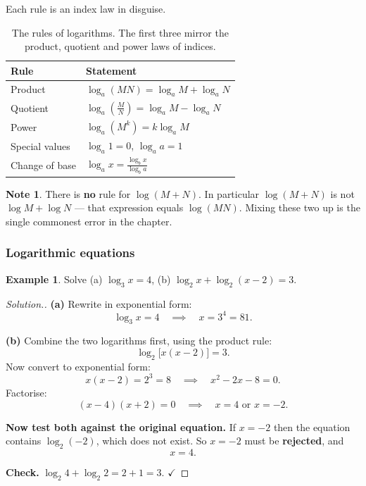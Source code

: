\documentclass[11pt,a4paper]{article}
\theoremstyle{definition}
\newtheorem{example}[thm]{Example}
\newtheorem{note}[thm]{Note}
\newenvironment{solution}
  {\renewcommand{\qedsymbol}{}\begin{proof}[\textit{Solution}.]}
  {\end{proof}}
\let\amscheckmark\checkmark
\renewcommand{\checkmark}{\ensuremath{\amscheckmark}}
\begin{document}
Each rule is an index law in disguise.

\begin{table}[H]
\centering
\begin{tabular}{|l|l|}
\hline
Rule & Statement\\
\hline
Product & $\log_a(MN)=\log_a M+\log_a N$\\
Quotient & $\log_a\!\left(\frac{M}{N}\right)=\log_a M-\log_a N$\\
Power & $\log_a\left(M^k\right)=k\log_a M$\\
Special values & $\log_a 1=0$, \quad $\log_a a=1$\\
Change of base & $\log_a x=\frac{\log_b x}{\log_b a}$\\
\hline
\end{tabular}
\caption{The rules of logarithms. The first three mirror the product, quotient and power laws of indices.}
\end{table}

\begin{note}
There is \textbf{no} rule for $\log(M+N)$. In particular $\log(M+N)$ is not
$\log M+\log N$ --- that expression equals $\log(MN)$. Mixing these two up is the single
commonest error in the chapter.
\end{note}

\subsubsection{Logarithmic equations}

\begin{example}
Solve (a) $\log_3 x=4$, \quad (b) $\log_2 x+\log_2(x-2)=3$.
\end{example}

\begin{solution}
\textbf{(a)} Rewrite in exponential form:
$$\log_3 x=4\quad\implies\quad x=3^4=81.$$

\textbf{(b)} Combine the two logarithms first, using the product rule:
$$\log_2\big[x(x-2)\big]=3.$$
Now convert to exponential form:
$$x(x-2)=2^3=8\quad\implies\quad x^2-2x-8=0.$$
Factorise:
$$(x-4)(x+2)=0\quad\implies\quad x=4 \text{ or } x=-2.$$

\textbf{Now test both against the original equation.} If $x=-2$ then the equation
contains $\log_2(-2)$, which does not exist. So $x=-2$ must be \textbf{rejected}, and
$$x=4.$$

\textbf{Check.} $\log_2 4+\log_2 2=2+1=3$. \checkmark
\end{solution}
\end{document}
